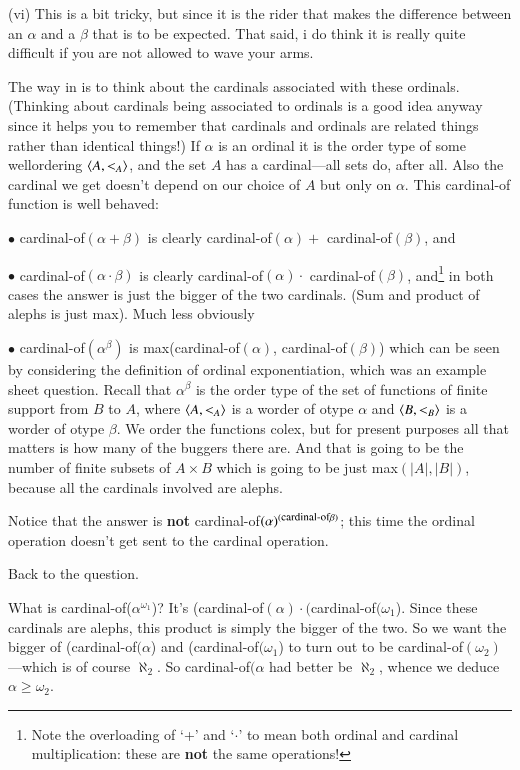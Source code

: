 \documentclass{book}
\begin{document}
\smallskip

(vi) This is a bit tricky, but since it is the rider that makes the
difference between an $\alpha$ and a $\beta$ that is to be expected.
That said, i do think it is really quite difficult if you are not
allowed to wave your arms.

The way in is to think about the cardinals associated with these
ordinals.  (Thinking about cardinals being associated to ordinals is a
good idea anyway since it helps you to remember that cardinals and
ordinals are related things rather than identical things!)  If
$\alpha$ is an ordinal it is the order type of some wellordering
$\mbox{$\langle A,<_A \rangle$}$, and the set $A$ has a cardinal---all sets do, after
all.  Also the cardinal we get doesn't depend on our choice of $A$ but
only on $\alpha$.  This cardinal-of function is well behaved:

$\bullet$ cardinal-of$(\alpha + \beta)$ is clearly cardinal-of$(\alpha)+$ cardinal-of$(\beta)$, and

$\bullet$ cardinal-of$(\alpha \cdot \beta)$ is clearly
cardinal-of$(\alpha)\cdot$ cardinal-of$(\beta)$, and\footnote{Note the
  overloading of `+' and `$\cdot$' to mean both ordinal and cardinal
  multiplication: these are {\bf not} the same operations!} in both
cases the answer is just the bigger of the two cardinals. (Sum and
product of alephs is just max).  \smallskip Much less obviously

$\bullet$ cardinal-of$(\alpha ^\beta)$ is max(cardinal-of$(\alpha)$,
cardinal-of$(\beta)$) which can be seen by considering the definition
of ordinal exponentiation, which was an example sheet question.
Recall that $\alpha^\beta$ is the order type of the set of functions
of finite support from $B$ to $A$, where $\mbox{$\langle A,<_A \rangle$}$ is a worder
of otype $\alpha$ and $\mbox{$\langle B,<_B \rangle$}$ is a worder of otype $\beta$.
We order the functions colex, but for present purposes all that
matters is how many of the buggers there are.  And that is going to be
the number of finite subsets of $A \times B$ which is going to be just
max$(|A|,|B|)$, because all the cardinals involved are alephs.

Notice that the answer is {\bf not}
cardinal-of$(\alpha)^{(\mbox{\footnotesize{\rm cardinal-of}}\beta)}$; this time the ordinal operation doesn't get sent to the cardinal operation.

\smallskip

Back to the question.

\smallskip

What is cardinal-of($\alpha^{\omega_1}$)?  It's (cardinal-of$(\alpha)
\cdot ($cardinal-of$(\omega_1$).  Since these cardinals are alephs,
this product is simply the bigger of the two.  So we want the bigger
of (cardinal-of$(\alpha$) and (cardinal-of$(\omega_1$) to turn out to
be cardinal-of$(\omega_2)$---which is of course $\aleph_2$.  So
cardinal-of$(\alpha$ had better be $\aleph_2$, whence we deduce
$\alpha \geq \omega_2$.
\end{document}
